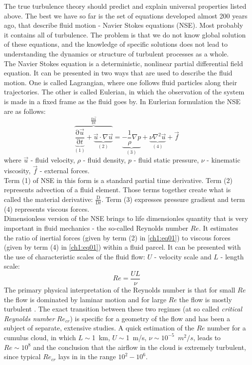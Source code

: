 \documentclass[../main.tex]{subfiles}
\begin{document}
The true turbulence theory should predict and explain universal properties listed above. The best we have so far is the set of equations developed almost 200 years ago, that describe fluid motion - Navier Stokes equations (NSE). Most probably it contains all of turbulence. The problem is that we do not know global solution of these equations, and the knowledge of specific solutions does not lead to understanding the dynamics or structure of turbulent processes as a whole.\\
The Navier Stokes equation is a deterministic, nonlinear partial differential field equation. It can be presented in two ways that are used to describe the fluid motion. One is called Lagrangian, where one follows fluid particles along their trajectories. The other is called Eulerian, in which the observation of the system is made in a fixed frame as the fluid goes by. In Eurlerian formulation the NSE are as follows:
\begin{equation}
\overbrace{\underbrace{\frac{\mathrm{\partial}\vec{u}}{\mathrm{\partial}t}}_{(1)}+\underbrace{\vec{u}\cdot\nabla \vec{u}}_{(2)}}^{\frac{\mathrm{D}\vec{u}}{\mathrm{D}t}}=\underbrace{-\frac{1}{\rho} \nabla p}_{(3)} +\underbrace{\nu \nabla^2 \vec{u}}_{(4)}+\vec{f}
\label{ch1:eq01}
\end{equation}
where $\vec{u}$ - fluid velocity, $\rho$ - fluid density, $p$ - fluid static pressure, $\nu$ - kinematic viscosity, $\vec{f}$ - external forces.\\
Term (1) of NSE in this form is a standard partial time derivative. Term (2) represents advection of a fluid element. Those terms together create what is called the material derivative: $\frac{\mathrm{D}}{\mathrm{D}t}$. Term (3) expresses pressure gradient and term (4) represents viscous forces.\\
Dimensionless version of the NSE brings to life dimensionles quantity that is very important in fluid mechanics - the so-called Reynolds number $Re$.  It estimates the ratio of inertial forces (given by term (2) in \ref{ch1:eq01}) to viscous forces (given by term (4) in \ref{ch1:eq01}) within a fluid parcel. It can be presented with the use of characteristic scales of the fluid flow: $U$ - velocity scale and $L$ - length scale:
\begin{equation}
Re=\frac{UL}{\nu}
\label{def:Re}
\end{equation}
The primary physical interpretation of the Reynolds number is that for small $Re$ the flow is dominated by laminar motion and for large $Re$  the flow is mostly turbulent \citep{Reynolds1883}. The exact transition between these two regimes (at so called \emph{critical Reynolds number} $Re_{cr}$) is specific for a geometry of the flow and has been a subject of separate, extensive studies. A quick estimation of the $Re$ number for a cumulus cloud, in which $L \sim$1~km, $U \sim$1~m/s, $\nu \sim10^{-5}$~$m^2/s$, leads to $Re \sim 10^8$ and the conclusion that the airflow in the cloud is extremely turbulent, since typical $Re_{cr}$ lays in in the range $10^2-10^6$.\\
\end{document}
